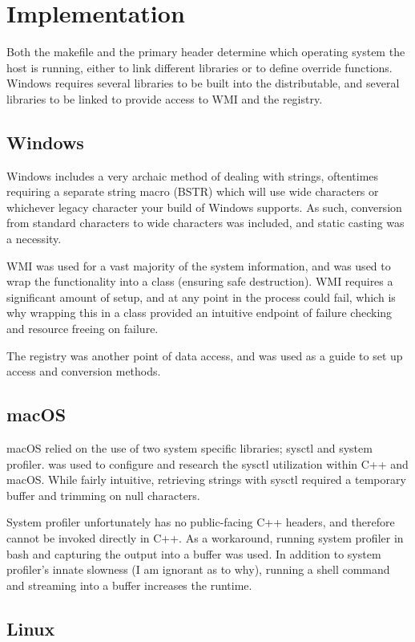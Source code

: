 \documentclass[conference]{IEEEtran}
\begin{document}
\section{Implementation}
Both the makefile and the primary header determine which operating system the host is running,
either to link different libraries or to define override functions.
Windows requires several libraries to be built into the distributable, and several libraries to
be linked to provide access to WMI and the registry.

\subsection{Windows}
Windows includes a very archaic method of dealing with strings, oftentimes requiring a separate string macro (BSTR)
which will use wide characters or whichever legacy character your build of Windows supports.
As such, conversion from standard characters to wide characters was included, and static casting was a necessity.

WMI was used for a vast majority of the system information,
and \cite{whims:wmi} was used to wrap the functionality into a class (ensuring safe destruction).
WMI requires a significant amount of setup, and at any point in the process could fail, which is why
wrapping this in a class provided an intuitive endpoint of failure checking and resource freeing on failure.

The registry was another point of data access, and \cite{dicanio:winreg} was used as a guide to set up
access and conversion methods.

\subsection{macOS}
macOS relied on the use of two system specific libraries; sysctl and system profiler.
\cite{aapl:sysctl} was used to configure and research the sysctl utilization within C++ and macOS.
While fairly intuitive, retrieving strings with sysctl required a temporary buffer and trimming on null characters.

System profiler unfortunately has no public-facing C++ headers, and therefore cannot be invoked directly in C++.
As a workaround, running system profiler in bash and capturing the output into a buffer was used.
In addition to system profiler's innate slowness (I am ignorant as to why),
running a shell command and streaming into a buffer increases the runtime.

\subsection{Linux}
\end{document}
